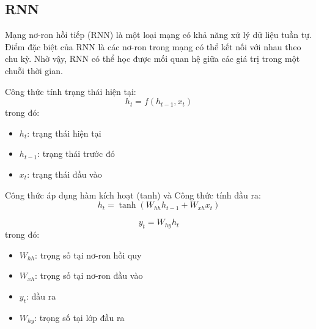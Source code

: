 \subsection{RNN}
Mạng nơ-ron hồi tiếp (RNN) là một loại mạng có khả năng xử lý dữ liệu tuần tự. Điểm đặc biệt của RNN là các nơ-ron trong mạng có thể kết nối với nhau theo chu kỳ. Nhờ vậy, RNN có thể học được mối quan hệ giữa các giá trị trong một chuỗi thời gian.


Công thức tính trạng thái hiện tại:
\[
h_t = f(h_{t-1}, x_t)
\]
trong đó:
\begin{itemize}
    \item $h_t$: trạng thái hiện tại
    \item $h_{t-1}$: trạng thái trước đó
    \item $x_t$: trạng thái đầu vào
\end{itemize}

Công thức áp dụng hàm kích hoạt (tanh) và Công thức tính đầu ra:
\[
h_t = \tanh(W_{hh}h_{t-1} + W_{xh}x_t)
\]

\[
y_t = W_{hy}h_t
\]
trong đó:
\begin{itemize}
    \item $W_{hh}$: trọng số tại nơ-ron hồi quy
    \item $W_{xh}$: trọng số tại nơ-ron đầu vào
    \item $y_t$: đầu ra
    \item $W_{hy}$: trọng số tại lớp đầu ra
\end{itemize}